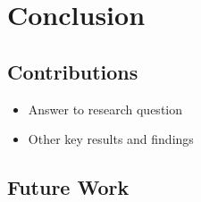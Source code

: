\section{Conclusion}

\subsection{Contributions}
\label{subsec:contributions}
\begin{itemize}
	\item Answer to research question
	\item Other key results and findings
\end{itemize}

\subsection{Future Work}
\label{subsec:futurework}
